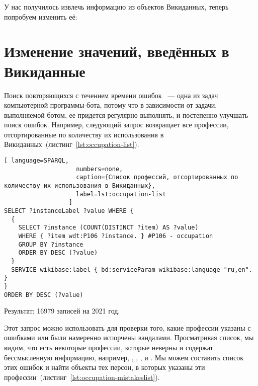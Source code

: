 
У нас получилось извлечь информацию из объектов Викиданных, теперь попробуем изменить её: 

\section{Изменение значений, введённых в Викиданные}
\label{sec:modifying the values entered in Wikidata}

Поиск повторяющихся с течением времени ошибок ~--- одна из задач компьютерной программы-бота, потому что в зависимости от задачи, выполняемой ботом, ее придется регулярно выполнять, и постепенно улучшать поиск ошибок. Например, следующий запрос возвращает все профессии, отсортированные по количеству их использования в Викиданных~(листинг~\ref{lst:occupation-list}).

\begin{lstlisting}[ language=SPARQL,
                    numbers=none,
                    caption={Cписок профессий, отсортированных по количеству их использования в Викиданных},
                    label=lst:occupation-list
                  ]
SELECT ?instanceLabel ?value WHERE {
  {
    SELECT ?instance (COUNT(DISTINCT ?item) AS ?value) 
    WHERE { ?item wdt:P106 ?instance. } #P106 - occupation
    GROUP BY ?instance
    ORDER BY DESC (?value)
  }
  SERVICE wikibase:label { bd:serviceParam wikibase:language "ru,en". }
}
ORDER BY DESC (?value)
\end{lstlisting} 

Результат: 16979 записей на 2021 год.

Этот запрос можно использовать для проверки того, какие профессии указаны с ошибками или были намеренно испорчены вандалами. Просматривая список, мы видим, что есть некоторые профессии, которые неверны и содержат бессмысленную информацию, например, , , ,  и . Мы можем составить список этих ошибок и найти объекты тех персон, в которых указаны эти профессии~(листинг~\ref{lst:occupation-mistakeslist}).

